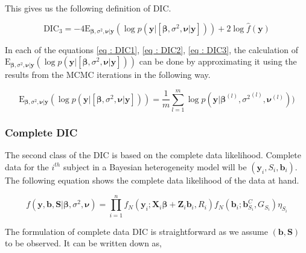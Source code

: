 This gives us the following definition of DIC.

\begin{equation}
\label{eq : DIC3}
\text{DIC}_3 = -4\text{E}_{\boldsymbol{\beta}, \sigma^2, \boldsymbol{\nu}|\boldsymbol{y}}(\log{p(\boldsymbol{y}|[\boldsymbol{\beta}, \sigma^2, \boldsymbol{\nu}|\boldsymbol{y}])}) + 2\log{\hat{f}(\boldsymbol{y})}
\end{equation}

In each of the equations \ref{eq : DIC1}, \ref{eq : DIC2}, \ref{eq : DIC3}, the calculation of $\text{E}_{\boldsymbol{\beta}, \sigma^2, \boldsymbol{\nu}|\boldsymbol{y}}(\log{p(\boldsymbol{y}|[\boldsymbol{\beta}, \sigma^2, \boldsymbol{\nu}|\boldsymbol{y}])}) $ can be done by approximating it using the results from the MCMC iterations in the following way.

\begin{equation}
\label{eq : mean_posterior_deviance_approx}
\text{E}_{\boldsymbol{\beta}, \sigma^2, \boldsymbol{\nu}|\boldsymbol{y}}(\log{p(\boldsymbol{y}|[\boldsymbol{\beta}, \sigma^2, \boldsymbol{\nu}|\boldsymbol{y}])})  = \frac 1 m \sum_{l=1}^m\log{p(\boldsymbol{y}|\boldsymbol{\beta}^{(l)}, {\sigma^2}^{(l)}, \boldsymbol{\nu}^{(l)})})
\end{equation}

\subsubsection{Complete DIC}
The second class of the DIC is based on the complete data likelihood. Complete data for the $i^{th}$ subject in a Bayesian heterogeneity model will be $(\boldsymbol{y}_i, S_i, \boldsymbol{b}_i)$. The following equation shows the complete data likelihood of the data at hand.

\begin{equation}
\label{eq : complete_data_likelihood}
f(\boldsymbol{y}, \boldsymbol{b}, \boldsymbol{S} | \boldsymbol{\beta}, \sigma^2, \boldsymbol{\nu}) = \prod_{i=1}^n f_N(\boldsymbol{y}_i; \boldsymbol{X}_i\boldsymbol{\beta} + \boldsymbol{Z}_i \boldsymbol{b}_i, R_i) f_N(\boldsymbol{b}_i; \boldsymbol{b}_{S_i}^C, G_{S_i}) \eta_{S_i}
\end{equation}

The formulation of complete data DIC is straightforward as we assume $(\boldsymbol{b}, \boldsymbol{S})$ to be observed. It can be written down as,

